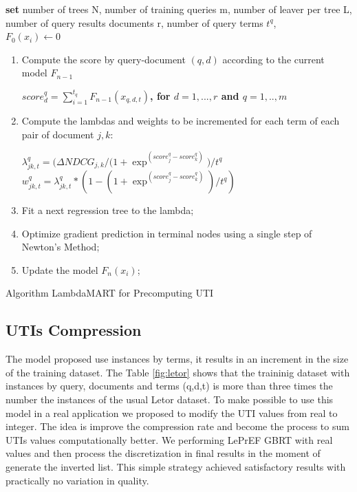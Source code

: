 \documentclass[preprint,12pt,3p]{elsarticle}
\begin{document}
\begin{algorithm}[H]
\SetAlgoLined
 \textbf{set} number of trees N, number of training queries m, number of leaver per tree L, number of query results documents r, number of query terms $t^q$, \\
 {
   $F_0(x_i) \gets 0$
}
 {
    \renewcommand{\labelenumi}{\alph{enumi})}
    \renewcommand{\labelenumii}{\alph{enumii})}

    \begin{enumerate}
        \item Compute the score by query-document $(q,d)$ according to the current model $F_{n-1}$ \\
        \begin{center}
         \textbf{$score_d^q = \sum_{i=1}^{t_q} F_{n-1}(x_{q,d,t} )$, for $d=1,...,r$ and $q=1,..,m$ }\\
        \end{center} 
        \item Compute the lambdas and weights to be incremented for each term of each pair of document $j,k$: \\
        \begin{left}
         \textbf{$\lambda_{jk,t}^q = \bigg( \Delta NDCG_{j,k} / (1 + \exp^{(score_j^q - score_k^q)} \bigg) /t^q $} \\
         \textbf{$w_{jk,t}^q=\lambda_{jk,t}^q * (1 - (1 + \exp^{(score_j^q - score_k^q)}) /t^q)$}
        \end{left}
        \item Fit a next regression tree to the lambda; \\
        \item Optimize gradient prediction in terminal nodes using a single step of Newton's Method;\\
        \item Update the model $F_n(x_i)$; \\
    \end{enumerate}
}   
\caption{Algorithm LambdaMART for Precomputing UTI }
\end{algorithm}


\subsection{UTIs Compression}
\label{sec:algorithm} 

The model proposed use instances by terms, it results in an increment in the size of the training dataset. The Table \ref{fig:letor} shows that the traininig dataset with instances by query, documents and terms (q,d,t) is more than three times the number the instances of the usual Letor dataset. To make possible to use this model in a real application we proposed to modify the UTI values from real to integer. The idea is improve the compression rate and become the process to sum UTIs values computationally better. We performing LePrEF GBRT with real values and then process the discretization in final results in the moment of generate the inverted list. This simple strategy achieved satisfactory results with practically no variation in quality. 
\end{document}
